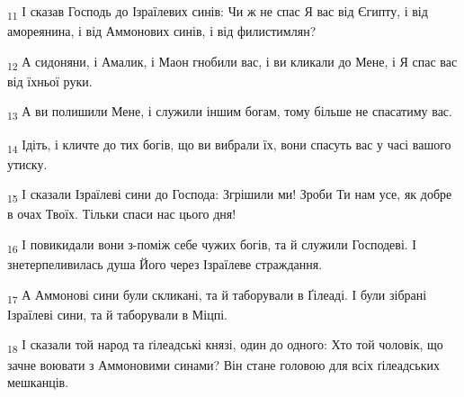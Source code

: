\begin{tcolorbox}
\textsubscript{11} І сказав Господь до Ізраїлевих синів: Чи ж не спас Я вас від Єгипту, і від амореянина, і від Аммонових синів, і від филистимлян?
\end{tcolorbox}
\begin{tcolorbox}
\textsubscript{12} А сидоняни, і Амалик, і Маон гнобили вас, і ви кликали до Мене, і Я спас вас від їхньої руки.
\end{tcolorbox}
\begin{tcolorbox}
\textsubscript{13} А ви полишили Мене, і служили іншим богам, тому більше не спасатиму вас.
\end{tcolorbox}
\begin{tcolorbox}
\textsubscript{14} Ідіть, і кличте до тих богів, що ви вибрали їх, вони спасуть вас у часі вашого утиску.
\end{tcolorbox}
\begin{tcolorbox}
\textsubscript{15} І сказали Ізраїлеві сини до Господа: Згрішили ми! Зроби Ти нам усе, як добре в очах Твоїх. Тільки спаси нас цього дня!
\end{tcolorbox}
\begin{tcolorbox}
\textsubscript{16} І повикидали вони з-поміж себе чужих богів, та й служили Господеві. І знетерпеливилась душа Його через Ізраїлеве страждання.
\end{tcolorbox}
\begin{tcolorbox}
\textsubscript{17} А Аммонові сини були скликані, та й таборували в Ґілеаді. І були зібрані Ізраїлеві сини, та й таборували в Міцпі.
\end{tcolorbox}
\begin{tcolorbox}
\textsubscript{18} І сказали той народ та ґілеадські князі, один до одного: Хто той чоловік, що зачне воювати з Аммоновими синами? Він стане головою для всіх ґілеадських мешканців.
\end{tcolorbox}

